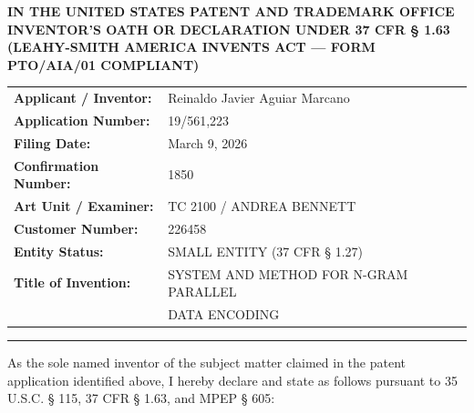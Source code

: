 \documentclass[11pt,letterpaper]{article}
\begin{document}
\thispagestyle{empty}

\begin{center}
    \textbf{\large IN THE UNITED STATES PATENT AND TRADEMARK OFFICE} \\
    \vspace{0.25cm}
    \textbf{\large INVENTOR'S OATH OR DECLARATION UNDER 37 CFR \S{} 1.63} \\
    \textbf{\normalsize (LEAHY-SMITH AMERICA INVENTS ACT --- FORM PTO/AIA/01 COMPLIANT)}
\end{center}

\vspace{0.25cm}
\noindent\begin{tabular*}{\textwidth}{@{\extracolsep{\fill}}ll}
\textbf{Applicant / Inventor:} & Reinaldo Javier Aguiar Marcano \\
\textbf{Application Number:} & 19/561,223 \\
\textbf{Filing Date:} & March 9, 2026 \\
\textbf{Confirmation Number:} & 1850 \\
\textbf{Art Unit / Examiner:} & TC 2100 / ANDREA BENNETT \\
\textbf{Customer Number:} & 226458 \\
\textbf{Entity Status:} & SMALL ENTITY (37 CFR \S{} 1.27) \\
\textbf{Title of Invention:} & SYSTEM AND METHOD FOR N-GRAM PARALLEL \\
& DATA ENCODING \\
\end{tabular*}

\vspace{0.25cm}
\hrule
\vspace{0.25cm}

As the sole named inventor of the subject matter claimed in the patent application identified above, I hereby declare and state as follows pursuant to 35 U.S.C. \S{} 115, 37 CFR \S{} 1.63, and MPEP \S{} 605:
\end{document}
